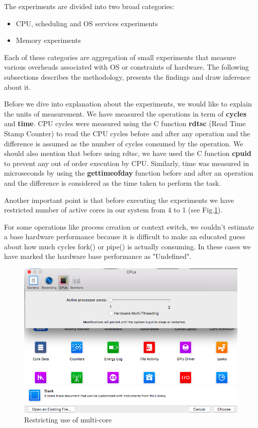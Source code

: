 \documentclass[conference]{IEEEtran}
\begin{document}
The experiments are divided into two broad categories:
\begin{itemize}
\item
CPU, scheduling and OS services experiments
\item
Memory experiments 
\end{itemize}
Each of these categories are aggregation of small experiments that measure various overheads associated with OS or constraints of hardware. The following subsections describes the methodology, presents the findings and draw inference about it.
\par Before we dive into explanation about the experiments, we would like to explain the units of measurement. We have measured the operations in term of \textbf{cycles} and \textbf{time}. CPU cycles were measured using the C function \textbf{rdtsc} (Read Time Stamp Counter) to read the CPU cycles before and after any operation and the difference is assumed as the number of cycles consumed by the operation. We should also mention that before using rdtsc, we have used the C function \textbf{cpuid} to prevent any out of order execution by CPU. Similarly, time was measured in microseconds by using the \textbf{gettimeofday} function before and after an operation and the difference is considered as the time taken to perform the task.   
\par Another important point is that before executing the experiments we have restricted number of active cores in our system from 4 to 1 (see Fig.\ref{fig:onecore}).
\par For some operations like process creation or context switch, we couldn't estimate a base hardware performance because it is difficult to make an educated guess about how much cycles fork() or pipe() is actually consuming. In these cases we have marked the hardware base performance as "Undefined".

\begin{figure}[h]
\centering
\includegraphics[scale=0.3]{OneCore.png}
\caption{Restricting use of multi-core}
\label{fig:onecore}
\end{figure}
\end{document}
